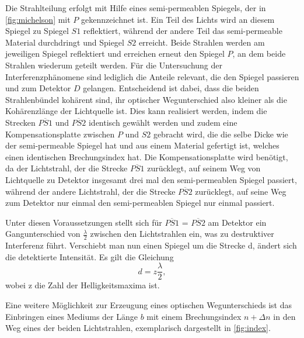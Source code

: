 Die Strahlteilung erfolgt mit Hilfe eines semi-permeablen Spiegels, der in \autoref{fig:michelson} mit $P$ gekennzeichnet
ist. Ein Teil des Lichts wird an diesem Spiegel zu Spiegel $S1$ reflektiert, während der andere Teil das semi-permeable 
Material durchdringt und Spiegel $S2$ erreicht. Beide Strahlen werden am jeweiligen Spiegel reflektiert und erreichen 
erneut den Spiegel $P$, an dem beide Strahlen wiederum geteilt werden. Für die Untersuchung der Interferenzphänomene sind
lediglich die Anteile relevant, die den Spiegel passieren und zum Detektor $D$ gelangen. Entscheidend ist dabei, dass
die beiden Strahlenbündel kohärent sind, ihr optischer Wegunterschied also kleiner als die Kohärenzlänge der Lichtquelle ist.
Dies kann realisiert werden, indem die Strecken $\overline{PS1}$ und $\overline{PS2}$ identisch gewählt werden und zudem eine
Kompensationsplatte zwischen $P$ und $S2$ gebracht wird, die die selbe Dicke wie der semi-permeable Spiegel hat und aus einem
Material gefertigt ist, welches einen identischen Brechungsindex hat. Die Kompensationsplatte wird benötigt, da der Lichtstrahl,
der die Strecke $\overline{PS1}$ zurücklegt, auf seinem Weg von Lichtquelle zu Detektor insgesamt drei mal den semi-permeablen
Spiegel passiert, während der andere Lichtstrahl, der die Strecke $\overline{PS2}$ zurücklegt, auf seine Weg zum Detektor nur einmal
den semi-permeablen Spiegel nur einmal passiert. 

Unter diesen Voraussetzungen stellt sich für $\overline{PS1}$ = $\overline{PS2}$ am Detektor ein Gangunterschied von $\frac{\lambda}{2}$ 
zwischen den Lichtstrahlen ein, was zu destruktiver Interferenz führt. Verschiebt man nun einen Spiegel um die Strecke
d, ändert sich die detektierte Intensität. Es gilt die Gleichung
\begin{equation}
    d = z \frac{\lambda}{2}
    \label{eq:lamb}, 
\end{equation}
wobei z die Zahl der Helligkeitsmaxima ist. 

Eine weitere Möglichkeit zur Erzeugung eines optischen Wegunterschieds ist das Einbringen eines Mediums der Länge $b$ mit einem 
Brechungsindex $n + \Delta n$ in den Weg eines der beiden Lichtstrahlen, exemplarisch dargestellt in \autoref{fig:index}. 


